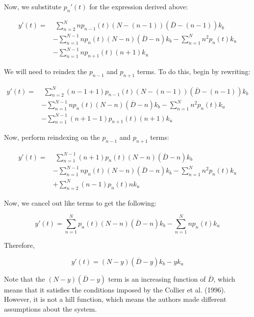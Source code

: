 \documentclass{article}
\begin{document}
\begin{flushleft}
Now, we substitute $p_{n}'(t)$ for the expression derived above:

$$
\begin{aligned}
  y'(t) = &\,\,\sum_{n = 2}^{N}  np_{n-1}(t)(N - (n - 1))(\overline{D} - (n - 1)) k_{b} \\[5pt]
          &-  \sum_{n = 1}^{N - 1} np_{n}(t) (N - n)(\overline{D} - n )k_{b} -  \sum_{n = 1}^{N}  n^2 p_{n}(t) k_{u} \\[5pt]
          &- \sum_{n = 1}^{N - 1}  np_{n+1}(t) (n+1)k_{u}
\end{aligned}
$$

We will need to reindex the $p_{n-1}$ and $p_{n+1}$ terms. To do this, begin by rewriting:

$$
\begin{aligned}
  y'(t) = &\,\,\sum_{n = 2}^{N}  (n-1 + 1)p_{n-1}(t)(N - (n - 1))(\overline{D} - (n - 1)) k_{b} \\[5pt] 
          &-  \sum_{n = 1}^{N - 1} np_{n}(t) (N - n)( \overline{D} - n)k_{b} -  \sum_{n = 1}^{N}  n^2 p_{n}(t) k_{u} \\[5pt]
          &- \sum_{n = 1}^{N - 1}  (n + 1 - 1)p_{n+1}(t) (n+1)k_{u}
\end{aligned}
$$

Now, perform reindexing on the $p_{n- 1}$ and $p_{n+1}$ terms:

$$
\begin{aligned}
y'(t) = &\,\,\sum_{n = 1}^{N - 1} (n + 1)p_{n}(t)(N - n) (\overline{D} - n)k_{b} \\[5pt]
        &-  \sum_{n = 1}^{N - 1} np_{n}(t) (N - n)(\overline{D} - n)k_{b} -  \sum_{n = 1}^{N}  n^2 p_{n}(t) k_{u} \\[5pt]
        &+  \sum_{n = 2}^{N}  (n - 1 )p_{n}(t) nk_{u} 
\end{aligned}
$$

Now, we cancel out like terms to get the following:

$$
y'(t) = \sum_{n = 1}^{N} p_{n}(t)(N - n)(\overline{D} - n)k_{b} - \sum_{n = 1}^{N} np_{n}(t)  k_{u}
$$

Therefore, 

$$
y'(t) = (N - y)(\overline{D} - y)k_{b} -  yk_{u}
$$

Note that the $(N - y)(\overline{D} - y)$ term is an increasing function of $\overline{D}$, which means that it satisfies the conditions imposed by the Collier et al. (1996). However, it is not a hill function, which means the authors made different assumptions about the system.

\end{flushleft}
\end{document}
